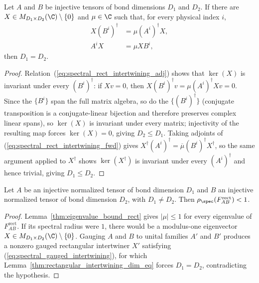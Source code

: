 \begin{lemma}%
    \label{thm:rectangular_intertwining_dim_eq}
    \leanok
    Let $A$ and $B$ be injective tensors of bond dimensions $D_1$ and $D_2$.
    If there are $X\in M_{D_1\times D_2}(\C)\setminus\{0\}$ and $\mu\in\C$
    such that, for every physical index $i$,
    \begin{align}
        X(B^i)^\dagger
         & =\mu(A^i)^\dagger X,
        \label{eq:spectral_rect_intertwining_adj} \\
        A^iX
         & =\mu XB^i,
        \label{eq:spectral_rect_intertwining_fwd}
    \end{align}
    then $D_1=D_2$.
\end{lemma}

\begin{proof}\leanok
    Relation~(\ref{eq:spectral_rect_intertwining_adj}) shows that
    $\ker(X)$ is invariant under every $(B^i)^\dagger$: if $Xv=0$, then
    $X(B^i)^\dagger v=\mu(A^i)^\dagger Xv=0$. Since the $\{B^i\}$ span the
    full matrix algebra, so do the $\{(B^i)^\dagger\}$ (conjugate
    transposition is a conjugate-linear bijection and therefore preserves
    complex linear spans), so
    $\ker(X)$ is invariant under every matrix; injectivity of the resulting
    map forces $\ker(X)=0$, giving $D_2\leq D_1$. Taking adjoints of
    (\ref{eq:spectral_rect_intertwining_fwd}) gives $X^\dagger(A^i)^\dagger=\overline\mu(B^i)^\dagger
        X^\dagger$, so the same argument applied to $X^\dagger$ shows
    $\ker(X^\dagger)$ is invariant under every $(A^i)^\dagger$ and hence
    trivial, giving $D_1\leq D_2$.
\end{proof}

\begin{lemma}\label{thm:transfer_operator_gap_rect}
    \leanok
    Let $A$ be an injective normalized tensor of bond dimension $D_1$ and
    $B$ an injective normalized tensor of bond dimension $D_2$, with
    $D_1\neq D_2$. Then
    $\rho_{\spec}(F_{AB}^{\mathrm{rect}})<1$.
\end{lemma}

\begin{proof}
    \leanok
    Lemma~\ref{thm:eigenvalue_bound_rect} gives $|\mu|\leq1$ for every
    eigenvalue of $F_{AB}^{\mathrm{rect}}$. If its spectral radius were
    $1$, there would be a modulus-one eigenvector
    $X\in M_{D_1\times D_2}(\C)\setminus\{0\}$.
    Gauging $A$ and $B$ to unital families $A'$ and $B'$ produces a nonzero
    gauged rectangular intertwiner $X'$ satisfying
    (\ref{eq:spectral_gauged_intertwining}), for which
    Lemma~\ref{thm:rectangular_intertwining_dim_eq} forces $D_1=D_2$,
    contradicting the hypothesis.
\end{proof}

